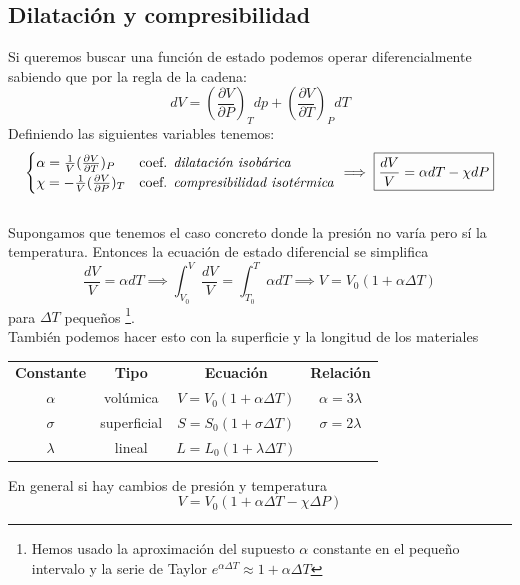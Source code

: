 \documentclass{myclass}
\begin{document}
\subsection{Dilatación y compresibilidad}
Si queremos buscar una función de estado podemos operar diferencialmente sabiendo que por la regla de la cadena:
$$
dV = (\frac{\partial V}{\partial P})_Tdp + (\frac{\partial V}{\partial T})_PdT
$$
Definiendo las siguientes variables tenemos:
$$
\begin{cases}
\alpha = \frac{1}{V}(\frac{\partial V}{\partial T})_P & \text{coef. \textit{dilatación isobárica}} \\
\chi = -\frac{1}{V}(\frac{\partial V}{\partial P})_T & \text{coef. \textit{compresibilidad isotérmica}}
\end{cases}
\implies \boxed{\frac{dV}{V} = \alpha dT - \chi dP}
$$
\\
Supongamos que tenemos el caso concreto donde la presión no varía pero sí la temperatura.
Entonces la ecuación de estado diferencial se simplifica
$$
\frac{dV}{V} = \alpha dT \implies \int_{V_0}^V\frac{dV}{V} = \int_{T_0}^T\alpha dT \implies V=V_0(1+\alpha\Delta T)
$$
para $\Delta T$ pequeños \footnote{\label{fn1} Hemos usado la aproximación del supuesto $\alpha$ constante en el pequeño intervalo y la serie de Taylor $e^{\alpha\Delta T} \approx 1+\alpha \Delta T$}.
\\
También podemos hacer esto con la superficie y la longitud de los materiales
\begin{center}
    \begin{tabular}{c c c c}
    \textbf{Constante} & \textbf{Tipo} & \textbf{Ecuación} & \textbf{Relación} \\
    $\alpha$ & volúmica & $V=V_0(1+\alpha \Delta T)$ & $\alpha = 3\lambda$ \\ 
    $\sigma$ & superficial & $S=S_0(1+\sigma \Delta T)$ & $\sigma = 2\lambda$ \\ 
    $\lambda$ & lineal & $L=L_0(1+\lambda \Delta T)$  &
\end{tabular}
\end{center}
En general si hay cambios de presión y temperatura
$$
V = V_0(1+\alpha\Delta T - \chi \Delta P)
$$
\end{document}
